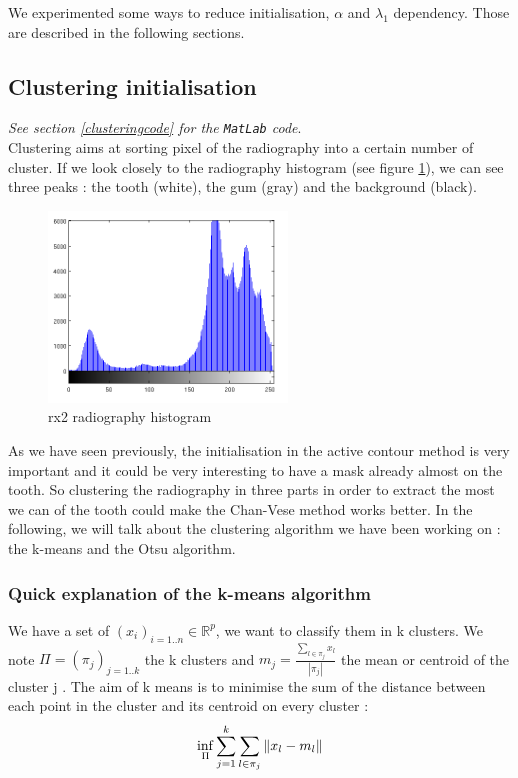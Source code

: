 We experimented some ways to reduce initialisation, $\alpha$ and $\lambda_1$ dependency. Those are described in the following sections.

\subsection{Clustering initialisation}
\textit{See section \ref{clusteringcode} for the \texttt{MatLab} code}.\\
Clustering aims at sorting pixel of the radiography into a certain number of cluster. If we look closely to the radiography histogram (see figure \ref{rx2histo}), we can see three peaks : the tooth (white), the gum (gray) and the background (black). 
\begin{figure}[H]
\centering
\includegraphics[scale=0.7]{images/rx2histo.png}
\caption{rx2 radiography histogram}
\label{rx2histo}
\end{figure}

As we have seen previously, the initialisation in the active contour method is very important and it could be very interesting to have a mask already almost on the tooth. So clustering the radiography in three parts in order to extract the most we can of the tooth could make the Chan-Vese method works better. In the following, we will talk about the clustering algorithm we have been working on : the k-means and the Otsu algorithm. 
\subsubsection*{Quick explanation of the k-means algorithm}
We have a set of $(x_{i})_{i=1..n} \in \mathbb{R}^p$, we want to classify them in k clusters. We note $\Pi = (\pi_{j})_{j=1..k}$ the k clusters and $m_{j} = \frac{\sum\limits_{l\in\pi_{j}}x_{l}}{|\pi_{j}|}$ the mean or centroid of the cluster j . The aim of k means is to minimise the sum of the distance between each point in the cluster and its centroid on every cluster : 
\begin{equation}
\centering
\inf\limits_{\Pi} \sum_{j=1}^{k} \sum\limits_{l\in\pi_{j}}\norm{x_{l}-m_{l}}
\label{kmeansformula}
\end{equation}

